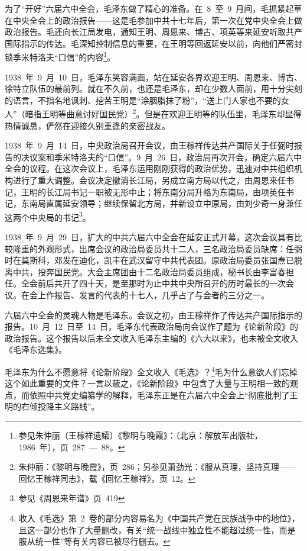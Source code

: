 为了“开好”六届六中全会，毛泽东做了精心的准备。在~8~至~9~月间，毛抓紧起草在中央全会上的政治报告——这是毛参加中共十七年后，第一次在党中央全会上做政治报告。毛还向长江局发电，通知王明、周恩来、博古、项英等来延安听取共产国际指示的传达。毛深知控制信息的重要，在王明等回返延安以前，向他们严密封锁季米特洛夫“口信”的内容\footnote{参见朱仲丽（王稼祥遗孀）《黎明与晚霞》：（北京：解放军出版社，1986~年），页~287~—~88。}。

1938~年~9~月~10~日，毛泽东笑容满面，站在延安各界欢迎王明、周恩来、博古、徐特立队伍的最前列。就在不久前，也还是毛泽东，却在少数人面前，用十分尖刻的语言，不指名地讽刺、挖苦王明是“涂胭脂抹了粉”，“送上门人家也不要的女人”（暗指王明等曲意讨好国民党）\footnote{朱仲丽：《黎明与晚霞》，页~286；另参见萧劲光：《服从真理，坚持真理——回忆王稼祥同志》，载《回忆王稼祥》，页~12。}。但是在欢迎王明等的队伍里，毛泽东却显得热情诚恳，俨然在迎接久别重逢的亲密战友。

1938~年~9~月~14~日，中央政治局召开会议，由王稼祥传达共产国际关于任弼时报告的决议案和季米特洛夫的“口信”。9~月~26~日，政治局再次开会，确定六届六中全会的议程。在这次会议上，毛泽东运用刚刚获得的政治优势，迅速对中共组织机构进行了重大调整。会议决定撤消长江局，另成立南方局以代之，由周恩来任书记，王明的长江局书记一职被无形中止；将东南分局升格为东南局，由项英任书记，东南局直属延安领导；继续保留北方局，并新设立中原局，由刘少奇一身兼任这两个中央局的书记\footnote{参见《周恩来年谱》页~419}。

1938~年~9~月~29~日，扩大的中共六届六中全会在延安正式开幕，这次会议具有比较隆重的外观形式，出席会议的政治局委员共十二人，三名政治局委员缺席：任弼时在莫斯科，邓发在迪化，凯丰在武汉留守中共代表团。原政治局委员张国焘已脱离中共，投奔国民党。大会主席团由十二名政治局委员组成，秘书长由李富春担任。全会前后共开了四十天，是至那时为止中共中央所召开的历时最长的一次会议。在会上作报告、发言的代表的十七人，几乎占了与会者的三分之一。

六届六中全会的灵魂人物是毛泽东。会议之初，由王稼祥作了传达共产国际指示的报告。10~月~12~日至~14~日，毛泽东代表政治局向会议作了题为《论新阶段》的政治报告。这个报告以后未全文收入毛泽东主编的《六大以来》，也未被全文收入《毛泽东选集》。

毛泽东为什么不愿意将《论新阶段》全文收入《毛选》？\footnote{收入《毛选》第~2~卷的部分内容易名为《中国共产党在民族战争中的地位》，且这一部分也作了大量删改，有关“统一战线中独立性不能超过统一性，而是服从统一性”等有关内容已被尽行删去。}毛为什么意欲人们忘掉这个如此重要的文件？一言以蔽之，《论新阶段》中包含了大量与王明相一致的观点，而依照中共党史编纂学的解释，毛泽东正是在六届六中全会上“彻底批判了王明的右倾投降主义路线”。

